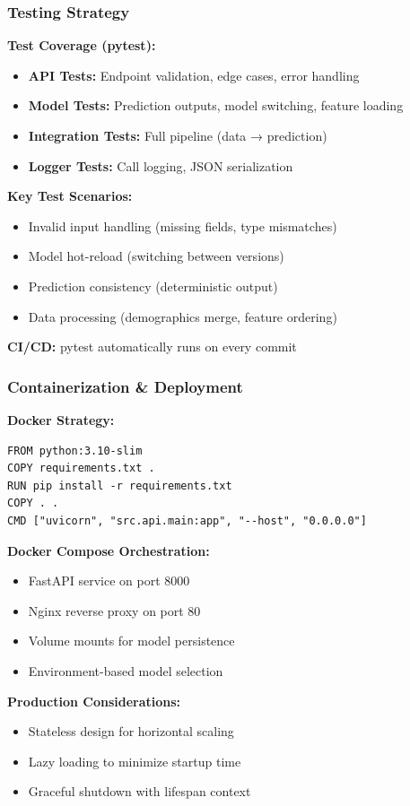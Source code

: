 \documentclass[aspectratio=169]{beamer}
\begin{document}
\begin{frame}
\frametitle{Testing Strategy}

\textbf{Test Coverage (pytest):}
\begin{itemize}
    \item \textbf{API Tests:} Endpoint validation, edge cases, error handling
    \item \textbf{Model Tests:} Prediction outputs, model switching, feature loading
    \item \textbf{Integration Tests:} Full pipeline (data → prediction)
    \item \textbf{Logger Tests:} Call logging, JSON serialization
\end{itemize}

\vspace{0.3cm}
\textbf{Key Test Scenarios:}
\begin{itemize}
    \item Invalid input handling (missing fields, type mismatches)
    \item Model hot-reload (switching between versions)
    \item Prediction consistency (deterministic output)
    \item Data processing (demographics merge, feature ordering)
\end{itemize}

\vspace{0.3cm}
\textbf{CI/CD:} pytest automatically runs on every commit
\end{frame}

\begin{frame}[fragile]
\frametitle{Containerization \& Deployment}

\textbf{Docker Strategy:}
\begin{lstlisting}
FROM python:3.10-slim
COPY requirements.txt .
RUN pip install -r requirements.txt
COPY . .
CMD ["uvicorn", "src.api.main:app", "--host", "0.0.0.0"]
\end{lstlisting}

\textbf{Docker Compose Orchestration:}
\begin{itemize}
    \item FastAPI service on port 8000
    \item Nginx reverse proxy on port 80
    \item Volume mounts for model persistence
    \item Environment-based model selection
\end{itemize}

\vspace{0.3cm}
\textbf{Production Considerations:}
\begin{itemize}
    \item Stateless design for horizontal scaling
    \item Lazy loading to minimize startup time
    \item Graceful shutdown with lifespan context
\end{itemize}
\end{frame}
\end{document}
